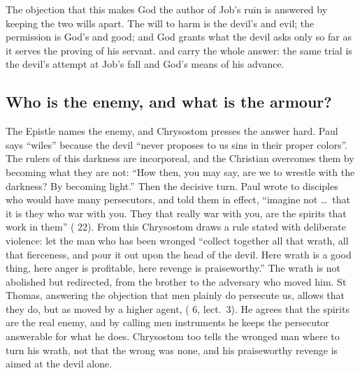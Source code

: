 The objection that this makes God the author of Job's ruin is answered by
keeping the two wills apart. The will to harm is the devil's and evil; the
permission is God's and good; and God grants what the devil asks only so far as
it serves the proving of his servant.  and  carry the whole answer: the same trial is the devil's attempt at
Job's fall and God's means of his advance.

\subsection{Who is the enemy, and what is the armour?}

The Epistle names the enemy, and Chrysostom presses the answer hard. Paul says
``wiles'' because the devil ``never proposes to us sins in their proper
colors''. The rulers of this darkness are incorporeal, and the Christian
overcomes them by becoming what they are not: ``How then, you may say, are we to
wrestle with the darkness? By becoming light.'' Then the decisive turn. Paul
wrote to disciples who would have many persecutors, and told them in effect,
``imagine not \dots\ that it is they who war with you. They that really war with
you, are the spirits that work in them'' ( 22). From
this Chrysostom draws a rule stated with deliberate violence: let the man who has
been wronged ``collect together all that wrath, all that fierceness, and pour it
out upon the head of the devil. Here wrath is a good thing, here anger is
profitable, here revenge is praiseworthy.'' The wrath is not abolished but
redirected, from the brother to the adversary who moved him. St Thomas, answering
the objection that men plainly do persecute us, allows that they do, but as moved
by a higher agent,  ( 6, lect.~3). He agrees that the spirits are the real
enemy, and by calling men instruments he keeps the persecutor answerable for
what he does. Chrysostom too tells the wronged man where to turn his wrath, not that the
wrong was none, and his praiseworthy revenge is aimed at the devil alone.

